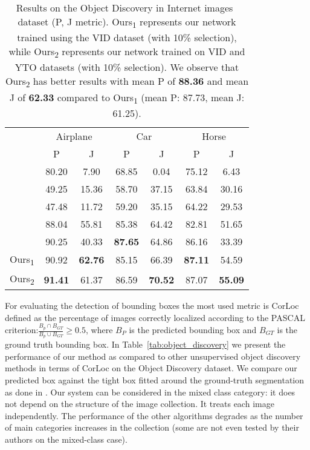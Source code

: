 \documentclass[10pt,twocolumn,letterpaper]{article}
\begin{document}
\begin{table}[t]
\begin{center}
\begin{tabular}{|c|c|c|c|c|c|c|}
\hline
\multirow{2}{*}{} & \multicolumn{2}{c|}{Airplane} & \multicolumn{2}{c|}{Car} & \multicolumn{2}{c|}{Horse} \\
\cline{2-7}
& P & J & P & J & P & J \\
\hline\hline
\cite{kim2011distributed} & 80.20 & 7.90 & 68.85 & 0.04 & 75.12 & 6.43 \\
\cite{joulin2010discriminative} & 49.25 & 15.36 & 58.70 & 37.15 & 63.84 & 30.16 \\
\cite{joulin2012multi} & 47.48 & 11.72 & 59.20 & 35.15 & 64.22 & 29.53 \\
\cite{rubinstein2013unsupervised} & 88.04 & 55.81 & 85.38 & 64.42 & 82.81 & 51.65 \\
\cite{chen2014enriching} & 90.25 & 40.33 & \textbf{87.65} & 64.86 & 86.16 & 33.39 \\

\hline
Ours\textsubscript{1} & 90.92 & \textbf{62.76} & 85.15 & 66.39 & \textbf{87.11} & 54.59 \\

Ours\textsubscript{2} & \textbf{91.41} & 61.37 & 86.59 & \textbf{70.52} & 87.07 & \textbf{55.09} \\

\hline
\end{tabular}
\end{center}
\caption{Results on the Object Discovery in Internet images~\cite{rubinstein2013unsupervised} dataset (P, J metric). Ours\textsubscript{1} represents our network trained using the VID dataset (with 10\% selection), while Ours\textsubscript{2} represents our network trained on VID and YTO datasets (with 10\% selection). We observe that Ours\textsubscript{2} has better results with mean P of \textbf{88.36} and mean J of \textbf{62.33} compared to Ours\textsubscript{1} (mean P: 87.73, mean J: 61.25).}
\label{tab:object_discovery_pj}
\end{table}


For evaluating the detection of bounding boxes 
the most used metric is CorLoc defined
as the percentage of images correctly localized according to the PASCAL criterion:$\frac{B_p \cap B_{GT}}{B_p \cup B_{GT}} \geq 0.5$,
where $B_P$ is the predicted bounding box and $B_{GT}$ is the ground truth bounding box. In
Table~\ref{tab:object_discovery} we present the performance of our method as compared to other
unsupervised object discovery methods in terms of CorLoc on the Object Discovery dataset. We compare our predicted box against the tight box fitted around the ground-truth segmentation as done in \cite{cho2015unsupervised,tang2014co}.
Our system can be considered in the mixed class category: it does not depend on the structure of the image collection. It treats each image independently. The performance of the other algorithms degrades as the number of main categories increases in the collection (some are not even tested by their authors on the mixed-class case).
\end{document}
